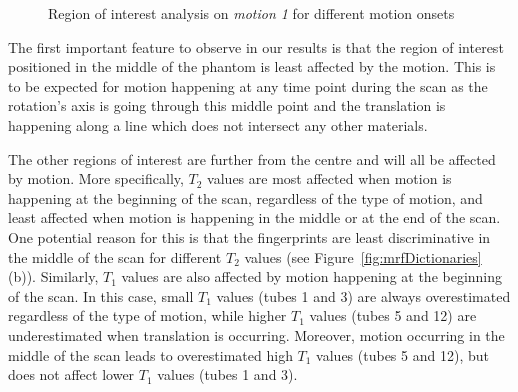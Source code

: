 \begin{figure}[ht]
    \caption{Region of interest analysis on \textit{motion 1} for different motion onsets}
    \label{fig:motion1ROI}
\end{figure}

\hfill

The first important feature to observe in our results is that the region of interest positioned in the middle of the phantom is least affected by the motion.
This is to be expected for motion happening at any time point during the scan as the rotation's axis is going through this middle point and the translation is happening along a line which does not intersect any other materials.

\hfill

The other regions of interest are further from the centre and will all be affected by motion.
More specifically, $T_2$ values are most affected when motion is happening at the beginning of the scan, regardless of the type of motion, and least affected when motion is happening in the middle or at the end of the scan.
One potential reason for this is that the fingerprints are least discriminative in the middle of the scan for different $T_2$ values (see Figure~\ref{fig:mrfDictionaries} (b)).
Similarly, $T_1$ values are also affected by motion happening at the beginning of the scan.
In this case, small $T_1$ values (tubes 1 and 3) are always overestimated regardless of the type of motion, while higher $T_1$ values (tubes 5 and 12) are underestimated when translation is occurring.
Moreover, motion occurring in the middle of the scan leads to overestimated high $T_1$ values (tubes 5 and 12), but does not affect lower $T_1$ values (tubes 1 and 3).

\hfill

